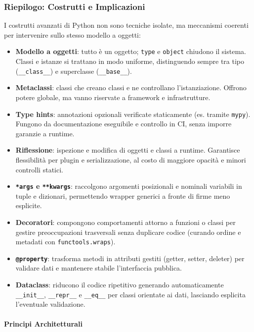 \documentclass[12pt]{extarticle}
\begin{document}
\subsubsection{Riepilogo: Costrutti e Implicazioni}

I costrutti avanzati di Python non sono tecniche isolate, ma meccanismi coerenti per intervenire sullo stesso modello a oggetti:

\begin{itemize}
    \item \textbf{Modello a oggetti}: tutto è un oggetto; \texttt{type} e \texttt{object} chiudono il sistema. Classi e istanze si trattano in modo uniforme, distinguendo sempre tra tipo (\texttt{\_\_class\_\_}) e superclasse (\texttt{\_\_base\_\_}).
    \item \textbf{Metaclassi}: classi che creano classi e ne controllano l'istanziazione. Offrono potere globale, ma vanno riservate a framework e infrastrutture.
    \item \textbf{Type hints}: annotazioni opzionali verificate staticamente (es. tramite \texttt{mypy}). Fungono da documentazione eseguibile e controllo in CI, senza imporre garanzie a runtime.
    \item \textbf{Riflessione}: ispezione e modifica di oggetti e classi a runtime. Garantisce flessibilità per plugin e serializzazione, al costo di maggiore opacità e minori controlli statici.
    \item \textbf{\texttt{*args} e \texttt{**kwargs}}: raccolgono argomenti posizionali e nominali variabili in tuple e dizionari, permettendo wrapper generici a fronte di firme meno esplicite.
    \item \textbf{Decoratori}: compongono comportamenti attorno a funzioni o classi per gestire preoccupazioni trasversali senza duplicare codice (curando ordine e metadati con \texttt{functools.wraps}).
    \item \textbf{\texttt{@property}}: trasforma metodi in attributi gestiti (getter, setter, deleter) per validare dati e mantenere stabile l'interfaccia pubblica.
    \item \textbf{Dataclass}: riducono il codice ripetitivo generando automaticamente \texttt{\_\_init\_\_}, \texttt{\_\_repr\_\_} e \texttt{\_\_eq\_\_} per classi orientate ai dati, lasciando esplicita l'eventuale validazione.
\end{itemize}

\paragraph{Principi Architetturali}
\end{document}
